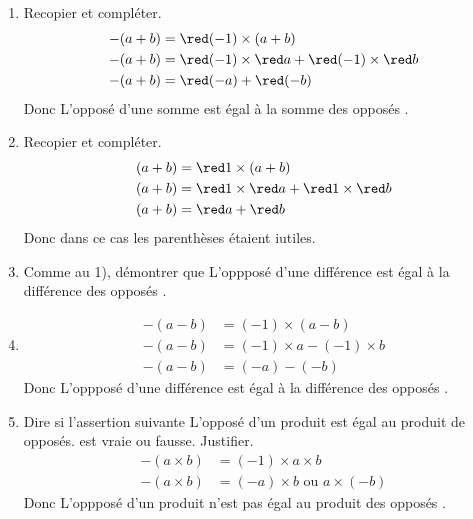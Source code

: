 \begin{corrige}
    \begin{enumerate}
        \item Recopier et compléter.
        \begin{align*}
            -(a+b)&= {\red (-1)}\times(a+b)\\
            -(a+b)&= {\red (-1)}\times{\red a} + {\red (-1)}\times{\red b}\\
            -(a+b)&= {\red (-a)}+{\red (-b)}
        \end{align*}
        Donc \og{} L'opposé d'une {\red somme} est égal à la somme des {\red opposés} \fg{}.
    \end{enumerate}
    \Coupe
    \begin{enumerate}
        \setcounter{enumi}{1}
        \item Recopier et compléter.
        \begin{align*}
            (a+b)&= {\red 1}\times(a+b)\\
            (a+b)&= {\red 1}\times{\red a} + {\red 1}\times{\red b}\\
            (a+b)&= {\red a}+{\red b}
        \end{align*}
        Donc dans ce cas les parenthèses étaient iutiles.
        \item Comme au 1), démontrer que \og{} L'oppposé d'une différence est égal à la différence des opposés \fg{}.\\
        \item {\red 
        \begin{align*}
            -(a-b)&= (-1)\times(a-b)\\
            -(a-b)&= (-1)\times a - (-1)\times b\\
            -(a-b)&= (-a)-(-b)
        \end{align*}
        Donc \og{} L'oppposé d'une différence est égal à la différence des opposés \fg{}.
        }
        \item Dire si l'assertion suivante  \og{} L'opposé d'un produit est égal au produit de opposés.\fg{} est vraie ou fausse. Justifier.\\
        {\red 
        \begin{align*}
            -(a\times b)&= (-1)\times a\times b\\
            -(a\times b)&= (-a)\times b \text{ ou } a\times (-b)
        \end{align*}
        Donc \og{} L'oppposé d'un produit n'est pas égal au produit des opposés \fg{}.
        }
    \end{enumerate}
\end{corrige}

